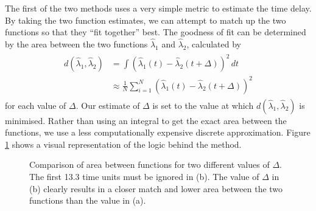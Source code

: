 \documentclass[a4paper,11pt]{article}
\begin{document}
   The first of the two methods uses a very simple metric to estimate the time
   delay. By taking the two function estimates, we can attempt to match up the
   two functions so that they ``fit together'' best. The goodness of fit can be
   determined by the area between the two functions $\hat{\lambda}_1$ and
   $\hat{\lambda}_2$, calculated by
   \begin{align}
   \begin{split}
   d(\hat{\lambda}_1,\hat{\lambda}_2)&=\int(\hat{\lambda}_1(t)-\hat{\lambda}_2(t+\Delta))^2\,dt\\
   &\approx\frac{1}{N}\sum_{i=1}^N(\hat{\lambda}_1(t)-\hat{\lambda}_2(t+\Delta))^2
   \end{split}
   \end{align}
   for each value of $\Delta$. Our estimate of $\Delta$ is set to the value at
   which $d(\hat{\lambda}_1,\hat{\lambda}_2)$ is minimised. Rather than using an
   integral to get the exact area between the functions, we use a less
   computationally expensive discrete approximation. Figure \ref{fig:areamethod}
   shows a visual representation of the logic behind the method.
   \begin{figure}[h]
   \caption{Comparison of area between functions for two different values of
   $\Delta$. The first 13.3 time units must be ignored in (b). The value of
   $\Delta$ in (b) clearly results in a closer match and lower area between the two functions
   than the value in (a).}
   \label{fig:areamethod}
   \end{figure}
\end{document}
